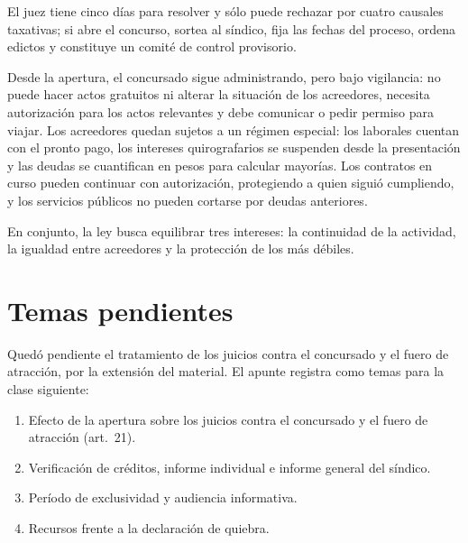 \documentclass[12pt,oneside]{book}
\begin{document}
El juez tiene cinco días para resolver y sólo puede rechazar por cuatro causales taxativas; si abre el concurso, sortea al síndico, fija las fechas del proceso, ordena edictos y constituye un comité de control provisorio.

Desde la apertura, el concursado sigue administrando, pero bajo vigilancia: no puede hacer actos gratuitos ni alterar la situación de los acreedores, necesita autorización para los actos relevantes y debe comunicar o pedir permiso para viajar. Los acreedores quedan sujetos a un régimen especial: los laborales cuentan con el pronto pago, los intereses quirografarios se suspenden desde la presentación y las deudas se cuantifican en pesos para calcular mayorías. Los contratos en curso pueden continuar con autorización, protegiendo a quien siguió cumpliendo, y los servicios públicos no pueden cortarse por deudas anteriores.

En conjunto, la ley busca equilibrar tres intereses: la continuidad de la actividad, la igualdad entre acreedores y la protección de los más débiles.

\section{Temas pendientes}

Quedó pendiente el tratamiento de los juicios contra el concursado y el fuero de atracción, por la extensión del material. El apunte registra como temas para la clase siguiente:
\begin{enumerate}
    \item Efecto de la apertura sobre los juicios contra el concursado y el fuero de atracción (art.~21).
    \item Verificación de créditos, informe individual e informe general del síndico.
    \item Período de exclusividad y audiencia informativa.
    \item Recursos frente a la declaración de quiebra.
\end{enumerate}
\end{document}
